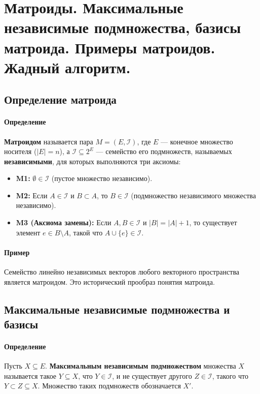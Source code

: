 \section{Матроиды. Максимальные независимые подмножества, базисы матроида. Примеры матроидов. Жадный алгоритм.}

\subsection*{Определение матроида}

\paragraph{Определение}
\textbf{Матроидом} называется пара $M = (E, \mathcal{I})$, где $E$ — конечное множество носителя ($|E|=n$), а $\mathcal{I} \subseteq 2^E$ — семейство его подмножеств, называемых \textbf{независимыми}, для которых выполняются три аксиомы:
\begin{itemize}
    \item \textbf{M1:} $\emptyset \in \mathcal{I}$ (пустое множество независимо).
    \item \textbf{M2:} Если $A \in \mathcal{I}$ и $B \subset A$, то $B \in \mathcal{I}$ (подмножество независимого множества независимо).
    \item \textbf{M3 (Аксиома замены):} Если $A, B \in \mathcal{I}$ и $|B| = |A| + 1$, то существует элемент $e \in B \setminus A$, такой что $A \cup \{e\} \in \mathcal{I}$.
\end{itemize}

\paragraph{Пример}
Семейство линейно независимых векторов любого векторного пространства является матроидом. Это исторический прообраз понятия матроида.

\subsection*{Максимальные независимые подмножества и базисы}

\paragraph{Определение}
Пусть $X \subseteq E$. \textbf{Максимальным независимым подмножеством} множества $X$ называется такое $Y \subseteq X$, что $Y \in \mathcal{I}$, и не существует другого $Z \in \mathcal{I}$, такого что $Y \subset Z \subseteq X$. Множество таких подмножеств обозначается $X'$.


